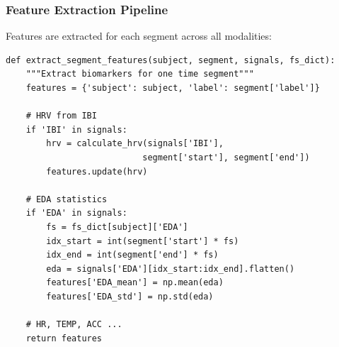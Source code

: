 \documentclass[12pt,letterpaper]{article}
\begin{document}
\subsubsection{Feature Extraction Pipeline}

Features are extracted for each segment across all modalities:

\begin{verbatim}
def extract_segment_features(subject, segment, signals, fs_dict):
    """Extract biomarkers for one time segment"""
    features = {'subject': subject, 'label': segment['label']}

    # HRV from IBI
    if 'IBI' in signals:
        hrv = calculate_hrv(signals['IBI'],
                           segment['start'], segment['end'])
        features.update(hrv)

    # EDA statistics
    if 'EDA' in signals:
        fs = fs_dict[subject]['EDA']
        idx_start = int(segment['start'] * fs)
        idx_end = int(segment['end'] * fs)
        eda = signals['EDA'][idx_start:idx_end].flatten()
        features['EDA_mean'] = np.mean(eda)
        features['EDA_std'] = np.std(eda)

    # HR, TEMP, ACC ...
    return features
\end{verbatim}




\end{document}
